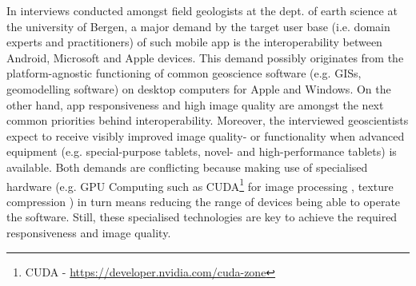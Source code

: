 \documentclass[review]{elsarticle}
\begin{document}
In interviews conducted amongst field geologists at the dept. of earth science at the university of Bergen, a major demand by the target user base (i.e. domain experts and practitioners) of such mobile app is the interoperability between Android, Microsoft and Apple devices. This demand possibly originates from the platform-agnostic functioning of common geoscience software (e.g. \glspl{GIS}, geomodelling software) on desktop computers for Apple and Windows. On the other hand, app responsiveness and high image quality are amongst the next common priorities behind interoperability. Moreover, the interviewed geoscientists expect to receive visibly improved image quality- or functionality when advanced equipment (e.g. special-purpose tablets, novel- and high-performance tablets) is available. Both demands are conflicting because making use of specialised hardware (e.g. \gls{GPU} Computing such as CUDA\footnote{CUDA - \url{https://developer.nvidia.com/cuda-zone}} for image processing \cite{Heymann2007,Hudelist2014}, texture compression \cite{Chait2015}) in turn means reducing the range of devices being able to operate the software. Still, these specialised technologies are key to achieve the required responsiveness and image quality.

\end{document}

